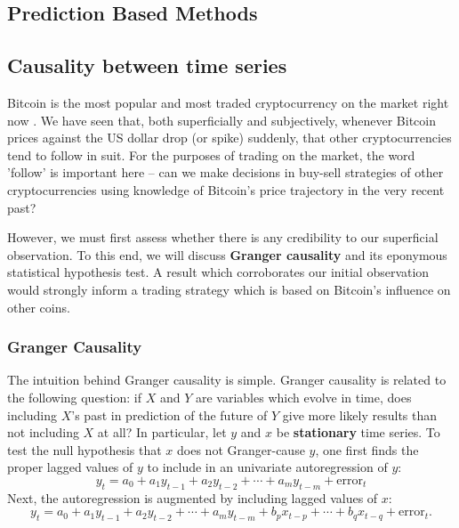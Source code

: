 \documentclass[twoside]{report}
\begin{document}
\begin{spacing}{1}


\chapter{Prediction Based Methods}
\section{Causality between time series}
Bitcoin is the most popular and most traded cryptocurrency on the market right now \cite{popularCryptos}. We have seen that, both superficially and subjectively, whenever Bitcoin prices against the US dollar drop (or spike) suddenly, that other cryptocurrencies tend to follow in suit. For the purposes of trading on the market, the word 'follow' is important here -- can we make decisions in buy-sell strategies of other cryptocurrencies using knowledge of Bitcoin's price trajectory in the very recent past? 

However, we must first assess whether there is any credibility to our superficial observation. To this end, we will discuss \textbf{Granger causality} and its eponymous statistical hypothesis test. A result which corroborates our initial observation would strongly inform a trading strategy which is based on Bitcoin's influence on other coins. 
\subsection{Granger Causality}
The intuition behind Granger causality is simple. Granger causality is related to the following question: if $X$ and $Y$ are variables which evolve in time, does including $X$'s past in prediction of the future of $Y$ give more likely results than not including $X$ at all? In particular, let $y$ and $x$ be \textbf{stationary} time series. To test the null hypothesis that $x$ does not Granger-cause $y$, one first finds the proper lagged values of $y$ to include in an univariate autoregression of $y$:
\[y_t = a_0 + a_1y_{t-1} + a_2y_{t-2} + \cdots + a_my_{t-m} + \text{error}_t\]
Next, the autoregression is augmented by including lagged values of $x$:
\[y_t = a_0 + a_1y_{t-1} + a_2y_{t-2} + \cdots + a_my_{t-m} + b_px_{t-p} + \cdots + b_qx_{t-q} + \text{error}_t.\]


\end{spacing}
\end{document}
